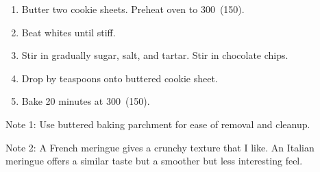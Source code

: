 
\begin{ingredients}
\end{ingredients}


\begin{recipe}
  \begin{enumerate}

  \item Butter two cookie sheets.  Preheat oven to 300\F\ (150\degreeC).

  \item Beat whites until stiff.

  \item Stir in gradually sugar, salt, and tartar.
    Stir in chocolate chips.

  \item Drop by teaspoons onto buttered cookie sheet.

  \item Bake 20 minutes at 300\F\ (150\degreeC).

  \end{enumerate}
\end{recipe}

Note 1: Use buttered baking parchment for ease of removal and cleanup.

Note 2: A French meringue gives a crunchy texture that I like.  An Italian meringue offers a similar taste but a smoother but less interesting feel.